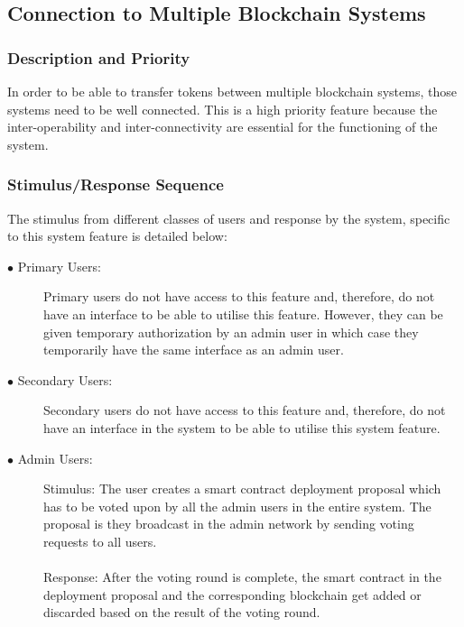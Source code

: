 \documentclass[a4paper,twoside,phd]{BYUPhys}
\begin{document}
\subsection{Connection to Multiple Blockchain Systems}
\subsubsection{Description and Priority}
In order to be able to transfer tokens between multiple blockchain systems, those systems need to be well connected. This is a high priority feature because the inter-operability and inter-connectivity are essential for the functioning of the system. 
\subsubsection{Stimulus/Response Sequence}
The stimulus from different classes of users and response by the system, specific to this system feature is detailed below:
\begin{description}
\item[$\bullet$ Primary Users:] Primary users do not have access to this feature and, therefore, do not have an interface to be able to utilise this feature. However, they can be given temporary authorization by an admin user in which case they temporarily have the same interface as an admin user.  
\item[$\bullet$ Secondary Users:]
Secondary users do not have access to this feature and, therefore, do not have an interface in the system to be able to utilise this system feature.
\item[$\bullet$ Admin Users:]
Stimulus: The user creates a smart contract deployment proposal which has to be voted upon by all the admin users in the entire system. The proposal is they broadcast in the admin network by sending voting requests to all users.
\\
\\
Response: After the voting round is complete, the smart contract in the deployment proposal and the corresponding blockchain get added or discarded based on the result of the voting round. 
\end{description}
\end{document}
